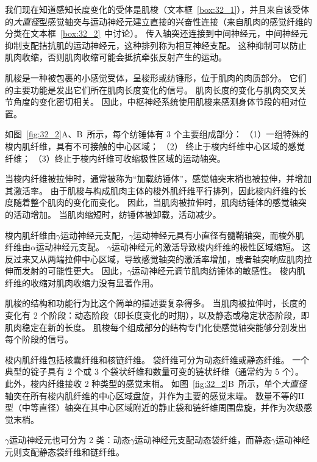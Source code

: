 我们现在知道感知长度变化的受体是肌梭（文本框~\ref{box:32_1}），并且来自该受体的\textit{大直径}型感觉轴突与运动神经元建立直接的兴奋性连接（来自肌肉的感觉纤维的分类在文本框~\ref{box:32_2}~中讨论）。
传入轴突还连接到中间神经元，中间神经元抑制支配拮抗肌的运动神经元，这种排列称为相互神经支配。
这种抑制可以防止肌肉收缩，否则肌肉收缩可能会抵抗牵张反射产生的运动。


\begin{proposition}[肌梭] \label{box:32_1}
	
	\quad \quad 肌梭是一种被包裹的小感觉受体，呈梭形或纺锤形，位于肌肉的肉质部分。
	它们的主要功能是发出它们所在肌肉长度变化的信号。
	肌肉长度的变化与肌肉交叉关节角度的变化密切相关。
	因此，中枢神经系统使用肌梭来感测身体节段的相对位置。
	
	\quad \quad 如图~\ref{fig:32_2}A、B~所示，每个纺锤体有 3 个主要组成部分：
	（1）一组特殊的梭内肌纤维，具有不可接触的中心区域；
	（2） 终止于梭内纤维中心区域的感觉纤维；
	（3）终止于梭内纤维可收缩极性区域的运动轴突。
	
	\quad \quad 当梭内纤维被拉伸时，通常被称为“加载纺锤体”，感觉轴突末梢也被拉伸，并增加其激活率。
	由于肌梭与构成肌肉主体的梭外肌纤维平行排列，因此梭内纤维的长度随着整个肌肉的变化而变化。
	因此，当肌肉被拉伸时，肌肉纺锤体的感觉轴突的活动增加。
	当肌肉缩短时，纺锤体被卸载，活动减少。
	
	\quad \quad 梭内肌纤维由$ \gamma $运动神经元支配，$ \gamma $运动神经元具有小直径有髓鞘轴突，而梭外肌纤维由$ \alpha $运动神经元支配。
	$ \gamma $运动神经元的激活导致梭内纤维的极性区域缩短。
	这反过来又从两端拉伸中心区域，导致感觉轴突的激活率增加，或者轴突响应肌肉拉伸而发射的可能性更大。
	因此，$ \gamma $运动神经元调节肌肉纺锤体的敏感性。
	梭内肌纤维的收缩对肌肉收缩力没有显著作用。
	
	\quad \quad 肌梭的结构和功能行为比这个简单的描述要复杂得多。
	当肌肉被拉伸时，长度的变化有 2 个阶段：动态阶段（即长度变化的时期），以及静态或稳定状态阶段，即肌肉稳定在新的长度。
	肌梭每个组成部分的结构专门化使感觉轴突能够分别发出每个阶段的信号。
	
	
	\quad \quad 梭内肌纤维包括核囊纤维和核链纤维。
	袋纤维可分为动态纤维或静态纤维。
	一个典型的锭子具有 2 个或 3 个袋状纤维和数量可变的链状纤维（通常约为 5 个）。
	此外，梭内纤维接收 2 种类型的感觉末梢。
	如图~\ref{fig:32_2}B~所示，单个\textit{大直径}轴突在所有梭内肌纤维的中心区域盘旋，并作为主要的感觉末端。
	数量不等的II型（中等直径）轴突在其中心区域附近的静止袋和链纤维周围盘旋，并作为次级感觉末梢。
	
	
	\quad \quad $ \gamma $运动神经元也可分为 2 类：动态$ \gamma $运动神经元支配动态袋纤维，而静态$ \gamma $运动神经元则支配静态袋纤维和链纤维。
	

\end{proposition}
